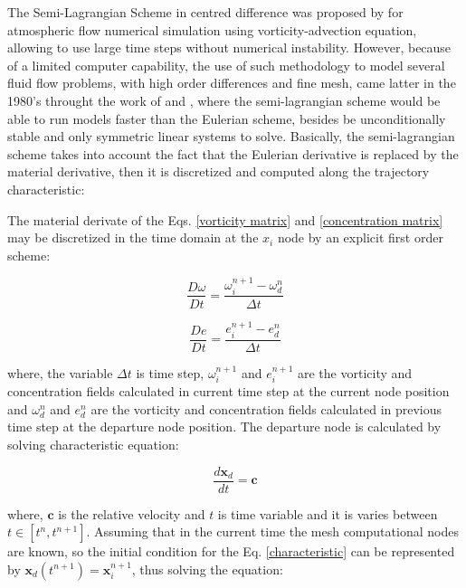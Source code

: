 The Semi-Lagrangian Scheme in centred difference was proposed by \cite{sawyer1963} for atmospheric flow numerical simulation using vorticity-advection equation, allowing to use large time steps without numerical instability. 
However, because of a limited computer capability, the use of such methodology to model several fluid flow problems, with high order differences and fine mesh, came latter in the 1980's throught the work of \cite{robert1981} and \cite{pironneau1982}, where the semi-lagrangian scheme would be able to run models faster than the Eulerian scheme, besides be unconditionally stable and only symmetric linear systems to solve. 
Basically, the semi-lagrangian scheme takes into account the fact that the Eulerian derivative is replaced by the material derivative, then it is discretized and computed along the trajectory characteristic:

The material derivate of the Eqs. \ref{vorticity matrix} and \ref{concentration matrix} may be discretized in the time
domain at the $x_{i}$ node by an explicit first order scheme:



\vspace{-0.4cm}
\begin{equation}
 \frac{D \omega}{D t} = 
 \frac{\omega_{i}^{n+1} - \omega_{d}^{n}}{\Delta t}
\end{equation}

\vspace{-0.8cm}
\begin{equation}
 \frac{D e}{D t} = 
 \frac{e_{i}^{n+1} - e_{d}^{n}}{\Delta t}
\end{equation}


\medskip
\noindent
where, 
the variable $\Delta t$ is time step, 
$\omega_{i}^{n+1}$ and $e_{i}^{n+1}$ are the vorticity and 
concentration fields calculated in current time step at the current 
node position and
$\omega_{d}^{n}$ and $e_{d}^{n}$ are the vorticity and 
concentration fields calculated in previous time step 
at the departure node position.
The departure node is calculated by solving characteristic equation:

\begin{equation} \label{characteristic}
\frac{d\textbf{x}_{d}}{dt} = \textbf{c}
\end{equation}

\medskip
\noindent
where,
$\textbf{c}$ is the relative velocity and
$t$ is time variable and 
it is varies between $t \in \left[t^{n},t^{n+1}\right]$.
Assuming that in the current time the mesh computational nodes
are known, so the initial condition for the Eq. \ref{characteristic}
can be represented by $\textbf{x}_{d}(t^{n+1}) = \textbf{x}_{i}^{n+1}$,
thus solving the equation:

